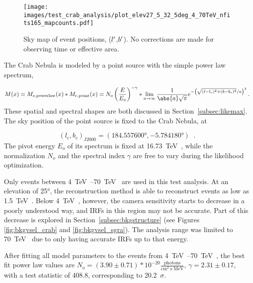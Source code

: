   
\begin{figure}[bt]
  \centering
  \texttt{[image: images/test\_crab\_analysis/plot\_elev27\_5\_32\_5deg\_4\_70TeV\_nfits165\_mapcounts.pdf]}
  \caption[Crab Nebula Counts Sky Map]
  {
    Sky map of event positions, ($l'$,$b'$).
    No corrections are made for observing time or effective area.
  }
  \label{fig:crab_skymap}
\end{figure}

The Crab Nebula is modeled by a point source with the simple power law spectrum,

\begin{equation}\label{eqn:crab_model}
  M(\xtrue) = M_{s,\textrm{powerlaw}}(\xtrue) * M_{e,\textrm{point}}(\xtrue) = N_o \left ( \frac{\Etrue}{E_o} \right )^{-\gamma} * \lim_{a\to\infty} \frac{1}{ \abs{a} \sqrt{\pi} } e^{ - \left ( \sqrt{ (\ltrue-l_c)^2 + (\btrue-b_c)^2 }/a \right )^2 } \,.
\end{equation}
These spatial and spectral shapes are both discussed in Section~\ref{subsec:likemax}.
The sky position of the point source is fixed to the Crab Nebula, at

$$(l_c,b_c)_{\textrm{J2000}} = (\ang{184.557600},\ang{-5.784180}) \;\;.$$
The pivot energy $E_o$ of its spectrum is fixed at \SI{16.73}{\TeV{}}, while the normalization $N_o$ and the spectral index $\gamma$ are free to vary during the likelihood optimization.

Only events between \SIrange{4}{70}{\TeV{}} are used in this test analysis.
At an elevation of \ang{25}, the reconstruction method is able to reconstruct events as low as \SI{1.5}{\TeV{}}.
Below \SI{4}{\TeV{}}, however, the camera sensitivity starts to decrease in a poorly understood way, and IRFs in this region may not be accurate.
Part of this decrease is explored in Section~\ref{subsec:bkgstructure} (see Figures \ref{fig:bkgvsel_crab} and \ref{fig:bkgvsel_sgra}).
The analysis range was limited to \SI{70}{\TeV{}} due to only having accurate IRFs up to that energy.
  
After fitting all model parameters to the events from \SIrange{4}{70}{\TeV{}}, the best fit power law values are $ N_o = \left(3.90\pm0.71\right)*10^{-20} \frac{\textrm{photons}}{\textrm{cm}^{2} \; \textrm{s} \; \textrm{MeV} } $, $ \gamma = 2.31 \pm 0.17 $, with a test statistic of 408.8, corresponding to \nicetilde{}\SI{20.2}{$\sigma$}.


